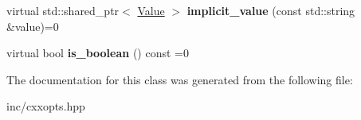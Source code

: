 \begin{DoxyCompactItemize}
\item 
virtual std\+::shared\+\_\+ptr$<$ \hyperlink{classcxxopts_1_1Value}{Value} $>$ {\bfseries implicit\+\_\+value} (const std\+::string \&value)=0\hypertarget{classcxxopts_1_1Value_a30ced2aabbc0190a0f07f78045e467e2}{}\label{classcxxopts_1_1Value_a30ced2aabbc0190a0f07f78045e467e2}

\item 
virtual bool {\bfseries is\+\_\+boolean} () const =0\hypertarget{classcxxopts_1_1Value_a77a4a731bcbbd95afca43f82affe5aaa}{}\label{classcxxopts_1_1Value_a77a4a731bcbbd95afca43f82affe5aaa}

\end{DoxyCompactItemize}


The documentation for this class was generated from the following file\+:\begin{DoxyCompactItemize}
\item 
inc/cxxopts.\+hpp\end{DoxyCompactItemize}
